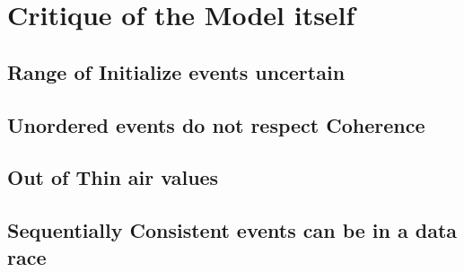 \section{Critique of the Model itself}

    \subsection{Range of Initialize events uncertain}

    \subsection{Unordered events do not respect Coherence}

    \subsection{Out of Thin air values}

    \subsection{Sequentially Consistent events can be in a data race}